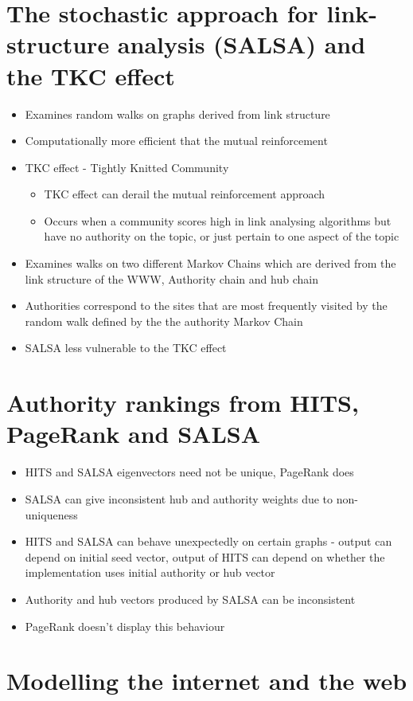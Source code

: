 \documentclass[11pt]{report}
\begin{document}
\section{The stochastic approach for link-structure analysis (SALSA) and the TKC effect}
\begin{itemize}
\item Examines random walks on graphs derived from link structure
\item Computationally more efficient that the mutual reinforcement
\item TKC effect - Tightly Knitted Community
\begin{itemize}
\item TKC effect can derail the mutual reinforcement approach
\item Occurs when a community scores high in link analysing algorithms but have no authority on the topic, or just pertain to one aspect of the topic
\end{itemize}
\item Examines walks on two different Markov Chains which are derived from the link structure of the WWW, Authority chain and hub chain
\item Authorities correspond to the sites that are most frequently visited by the random walk defined by the the authority Markov Chain
\item SALSA less vulnerable to the TKC effect
\end{itemize}
\section{Authority rankings from HITS, PageRank and SALSA}
\begin{itemize}
\item HITS and SALSA eigenvectors need not be unique, PageRank does
\item SALSA can give inconsistent hub and authority weights due to non-uniqueness
\item HITS and SALSA can behave unexpectedly on certain graphs - output can depend on initial seed vector, output of HITS can depend on whether the implementation uses initial authority or hub vector
\item Authority and hub vectors produced by SALSA can be inconsistent
\item PageRank doesn't display this behaviour
\end{itemize}
\section{Modelling the internet and the web}
\end{document}
